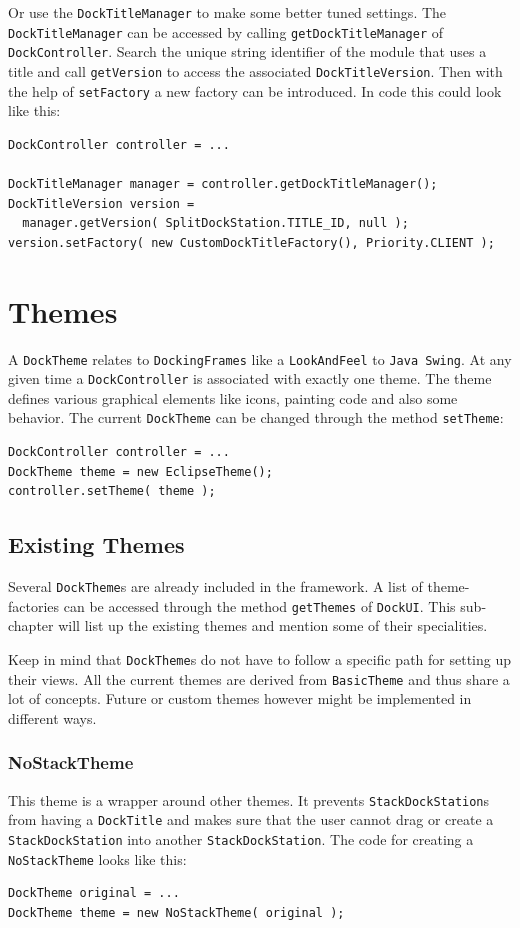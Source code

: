 \documentclass[a4paper,10pt]{article}
\newcommand{\src}[1]{\texttt{#1}}
\begin{document}
Or use the \src{DockTitleManager} to make some better tuned settings. The \linebreak \src{DockTitleManager} can be accessed by calling \src{getDockTitleManager} of \linebreak \src{DockController}. Search the unique string identifier of the module that uses a title and call \src{getVersion} to access the associated \src{DockTitleVersion}. Then with the help of \src{setFactory} a new factory can be introduced. In code this could look like this:
\begin{lstlisting}
DockController controller = ...

DockTitleManager manager = controller.getDockTitleManager();
DockTitleVersion version =
  manager.getVersion( SplitDockStation.TITLE_ID, null );
version.setFactory( new CustomDockTitleFactory(), Priority.CLIENT );
\end{lstlisting}

\section{Themes}
A \src{DockTheme} relates to \src{DockingFrames} like a \src{LookAndFeel} to \src{Java Swing}. At any given time a \src{DockController} is associated with exactly one theme. The theme defines various graphical elements like icons, painting code and also some behavior. The current \src{DockTheme} can be changed through the method \src{setTheme}:
\begin{lstlisting}
DockController controller = ...
DockTheme theme = new EclipseTheme();
controller.setTheme( theme );
\end{lstlisting}

\subsection{Existing Themes}
Several \src{DockTheme}s are already included in the framework. A list of theme-factories can be accessed through the method \src{getThemes} of \src{DockUI}. This sub-chapter will list up the existing themes and mention some of their specialities.

Keep in mind that \src{DockTheme}s do not have to follow a specific path for setting up their views. All the current themes are derived from \src{BasicTheme} and thus share a lot of concepts. Future or custom themes however might be implemented in different ways.

\subsubsection{NoStackTheme}
This theme is a wrapper around other themes. It prevents \src{StackDockStation}s from having a \src{DockTitle} and makes sure that the user cannot drag or create a \src{StackDockStation} into another \src{StackDockStation}. The code for creating a \src{NoStackTheme} looks like this:
\begin{lstlisting}
DockTheme original = ...
DockTheme theme = new NoStackTheme( original );
\end{lstlisting}
\end{document}
